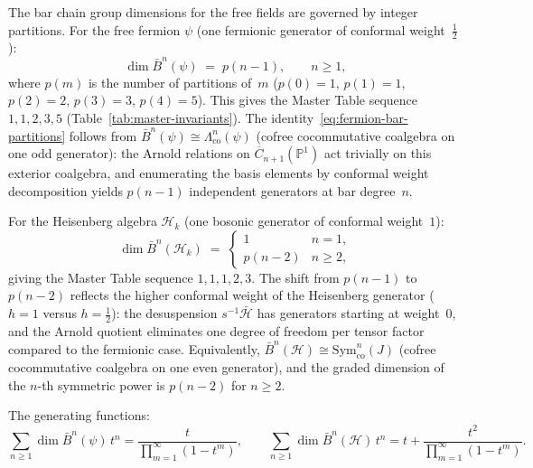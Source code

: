 \begin{lemma}%
\label{lem:bar-dims-partitions}
The bar chain group dimensions for the free fields are governed by
integer partitions.  For the free fermion $\psi$ (one fermionic
generator of conformal weight~$\frac{1}{2}$):
\begin{equation}\label{eq:fermion-bar-partitions}
\dim \bar{B}^n(\psi) \;=\; p(n-1), \qquad n \geq 1,
\end{equation}
where $p(m)$ is the number of partitions of~$m$
($p(0) = 1$, $p(1) = 1$, $p(2) = 2$, $p(3) = 3$, $p(4) = 5$).
This gives the Master Table sequence $1, 1, 2, 3, 5$
(Table~\ref{tab:master-invariants}).
The identity~\eqref{eq:fermion-bar-partitions} follows from
$\bar{B}^n(\psi) \cong \Lambda^n_{\mathrm{co}}(\psi)$
(cofree cocommutative coalgebra on one odd generator):
the Arnold relations on $\overline{C}_{n+1}(\mathbb{P}^1)$ act
trivially on this exterior coalgebra, and enumerating the basis
elements by conformal weight decomposition yields $p(n-1)$
independent generators at bar degree~$n$.

For the Heisenberg algebra $\mathcal{H}_k$ (one bosonic generator
of conformal weight~$1$):
\begin{equation}\label{eq:heisenberg-bar-partitions}
\dim \bar{B}^n(\mathcal{H}_k) \;=\;
\begin{cases}
1 & n = 1, \\
p(n-2) & n \geq 2,
\end{cases}
\end{equation}
giving the Master Table sequence $1, 1, 1, 2, 3$.
The shift from $p(n-1)$ to $p(n-2)$ reflects the higher
conformal weight of the Heisenberg generator ($h = 1$ versus
$h = \frac{1}{2}$): the desuspension $s^{-1}\bar{\mathcal{H}}$
has generators starting at weight~$0$, and the Arnold quotient
eliminates one degree of freedom per tensor factor compared to
the fermionic case.  Equivalently,
$\bar{B}^n(\mathcal{H}) \cong \mathrm{Sym}^n_{\mathrm{co}}(J)$
(cofree cocommutative coalgebra on one even generator), and the
graded dimension of the $n$-th symmetric power is $p(n-2)$
for $n \geq 2$.

The generating functions:
\[
\sum_{n \geq 1} \dim \bar{B}^n(\psi)\, t^n
= \frac{t}{\prod_{m=1}^\infty (1-t^m)},
\qquad
\sum_{n \geq 1} \dim \bar{B}^n(\mathcal{H})\, t^n
= t + \frac{t^2}{\prod_{m=1}^\infty (1-t^m)}.
\]
\end{lemma}


